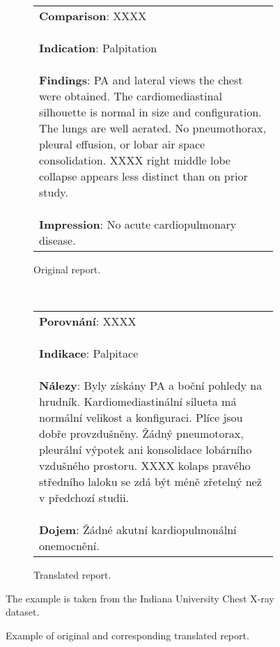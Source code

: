 \begin{figure}[htb]
        \centering
        \begin{subfigure}[t]{\linewidth}
            \centering
            \begin{tabular}{|l|}
\hline
\parbox{14cm}{
\vspace{0.25em}\textbf{Comparison}: XXXX\\
\\
\textbf{Indication}: Palpitation\\
\\
\textbf{Findings}: PA and lateral views the chest were obtained. The cardiomediastinal silhouette is normal in size and configuration. The lungs are well aerated. No pneumothorax, pleural effusion, or lobar air space consolidation. XXXX right middle lobe collapse appears less distinct than on prior study.\\
\\
\textbf{Impression}: No acute cardiopulmonary disease.\vspace{0.25em}}
\\ \hline
             \end{tabular}
             \caption{Original report.}
        \end{subfigure}%
\\ \vspace{1em}
        \begin{subfigure}[t]{\linewidth}
            \centering
            \begin{tabular}{|l|}
\hline
\parbox{14cm}{
\vspace{0.25em}\textbf{Porovnání}: XXXX\\
\\
\textbf{Indikace}: Palpitace\\
\\
\textbf{Nálezy}: Byly získány PA a boční pohledy na hrudník. Kardiomediastinální silueta má normální velikost a konfiguraci. Plíce jsou dobře provzdušněny. Žádný pneumotorax, pleurální výpotek ani konsolidace lobárního vzdušného prostoru. XXXX kolaps pravého středního laloku se zdá být méně zřetelný než v předchozí studii.\\
\\
\textbf{Dojem}: Žádné akutní kardiopulmonální onemocnění.\vspace{0.25em}}
\\ \hline
            \end{tabular}
            \caption{Translated report.}
        \end{subfigure}
        \caption{Example of original and corresponding translated report.}
	\label{fig03:translationExample}
The example is taken from the Indiana University Chest X-ray dataset.
\end{figure}

